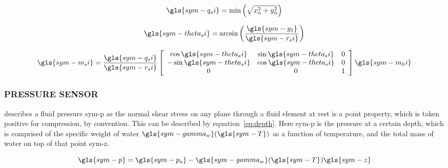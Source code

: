 \begin{equation}
    \label{eq:ellipse_min}
    \gls{sym-q_si} = \min \left(\sqrt{x_n^2 + y_n^2}\right)
\end{equation}

\begin{equation}
    \label{eq:theta_ellipse}
    \gls{sym-theta_si} = \arcsin\left(\frac{\gls{sym-y_1}}{\gls{sym-r_si}}\right)
\end{equation}

\begin{equation}
    \label{eq:correct heading}
    \gls{sym-m_si} = \frac{\gls{sym-q_si}}{\gls{sym-r_si}} \left[\begin{array}{ccc}
                                                                     \cos \gls{sym-theta_si} & \sin
                                                                     \gls{sym-theta_si} & 0 \\
                                                                     -\sin \gls{sym-theta_si} & \cos
                                                                     \gls{sym-theta_si} & 0 \\
                                                                     0 & 0
                                                                     & 1
    \end{array}\right] \gls{sym-m_hi}
\end{equation}

\subsubsection{PRESSURE SENSOR}\label{sec:pressure sensor}

\citet{white_fluid_2011} describes a fluid pressure \gls{sym-p} as the normal shear stress on any plane through a fluid
element at rest is a point property, which is taken positive for compression, by convention. This can be described by
equation~\ref{eq:depth}. Here \gls{sym-p} is the pressure at a certain depth, which is comprised of the specific weight
of water \( \gls{sym-gamma_w}(\gls{sym-T}) \) as a function of temperature, and the total mass of water on top of
that point \gls{sym-z}.

\begin{equation}
    \label{eq:depth}
    \gls{sym-p} = \gls{sym-p_a} - \gls{sym-gamma_w}(\gls{sym-T}) \gls{sym-z}
\end{equation}

